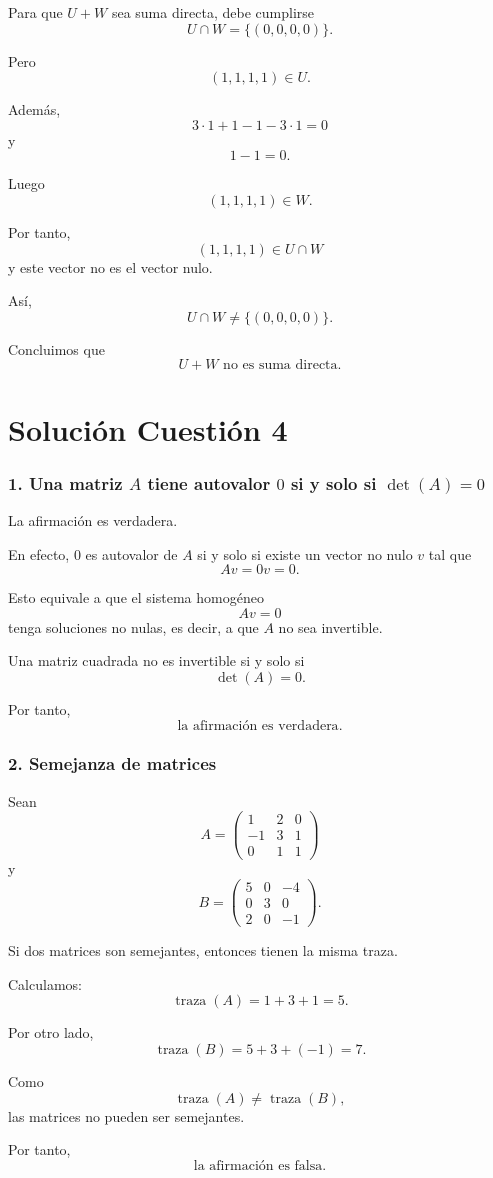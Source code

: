 \documentclass[12pt]{article}
\begin{document}
Para que \(U+W\) sea suma directa, debe cumplirse
\[
U\cap W=\{(0,0,0,0)\}.
\]

Pero
\[
(1,1,1,1)\in U.
\]

Además,
\[
3\cdot 1+1-1-3\cdot 1=0
\]
y
\[
1-1=0.
\]

Luego
\[
(1,1,1,1)\in W.
\]

Por tanto,
\[
(1,1,1,1)\in U\cap W
\]
y este vector no es el vector nulo.

Así,
\[
U\cap W\neq \{(0,0,0,0)\}.
\]

Concluimos que
\[
\boxed{U+W\text{ no es suma directa}.}
\]

\section*{Solución Cuestión 4}

\subsubsection*{1. Una matriz \(A\) tiene autovalor \(0\) si y solo si \(\det(A)=0\)}

La afirmación es verdadera.

En efecto, \(0\) es autovalor de \(A\) si y solo si existe un vector no nulo \(v\) tal que
\[
Av=0v=0.
\]

Esto equivale a que el sistema homogéneo
\[
Av=0
\]
tenga soluciones no nulas, es decir, a que \(A\) no sea invertible.

Una matriz cuadrada no es invertible si y solo si
\[
\det(A)=0.
\]

Por tanto,
\[
\boxed{\text{la afirmación es verdadera}.}
\]

\subsubsection*{2. Semejanza de matrices}

Sean
\[
A=
\begin{pmatrix}
1&2&0\\
-1&3&1\\
0&1&1
\end{pmatrix}
\]
y
\[
B=
\begin{pmatrix}
5&0&-4\\
0&3&0\\
2&0&-1
\end{pmatrix}.
\]

Si dos matrices son semejantes, entonces tienen la misma traza.

Calculamos:
\[
\operatorname{traza}(A)=1+3+1=5.
\]

Por otro lado,
\[
\operatorname{traza}(B)=5+3+(-1)=7.
\]

Como
\[
\operatorname{traza}(A)\neq \operatorname{traza}(B),
\]
las matrices no pueden ser semejantes.

Por tanto,
\[
\boxed{\text{la afirmación es falsa}.}
\]
\end{document}
